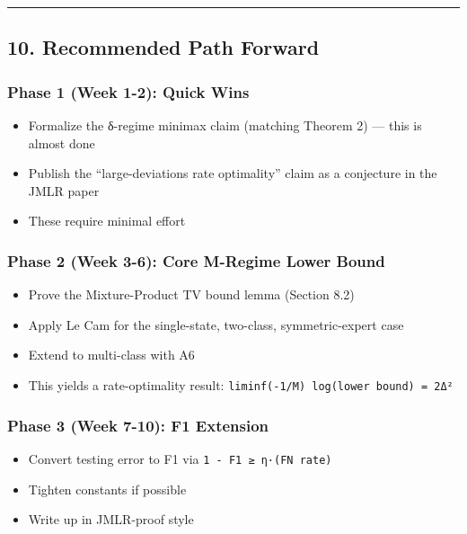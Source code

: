 \documentclass[
  12pt,
]{article}
\providecommand{\tightlist}{%
  \setlength{\itemsep}{0pt}\setlength{\parskip}{0pt}}
\begin{document}
\begin{center}\rule{0.5\linewidth}{0.5pt}\end{center}

\subsection{10. Recommended Path
Forward}\label{recommended-path-forward}

\subsubsection{Phase 1 (Week 1-2): Quick
Wins}\label{phase-1-week-1-2-quick-wins}

\begin{itemize}
\tightlist
\item
  Formalize the δ-regime minimax claim (matching Theorem 2) --- this is
  almost done
\item
  Publish the ``large-deviations rate optimality'' claim as a conjecture
  in the JMLR paper
\item
  These require minimal effort
\end{itemize}

\subsubsection{Phase 2 (Week 3-6): Core M-Regime Lower
Bound}\label{phase-2-week-3-6-core-m-regime-lower-bound}

\begin{itemize}
\tightlist
\item
  Prove the Mixture-Product TV bound lemma (Section 8.2)
\item
  Apply Le Cam for the single-state, two-class, symmetric-expert case
\item
  Extend to multi-class with A6
\item
  This yields a rate-optimality result:
  \texttt{liminf(-1/M)\ log(lower\ bound)\ =\ 2Δ²}
\end{itemize}

\subsubsection{Phase 3 (Week 7-10): F1
Extension}\label{phase-3-week-7-10-f1-extension}

\begin{itemize}
\tightlist
\item
  Convert testing error to F1 via \texttt{1\ -\ F1\ ≥\ η·(FN\ rate)}
\item
  Tighten constants if possible
\item
  Write up in JMLR-proof style
\end{itemize}
\end{document}
